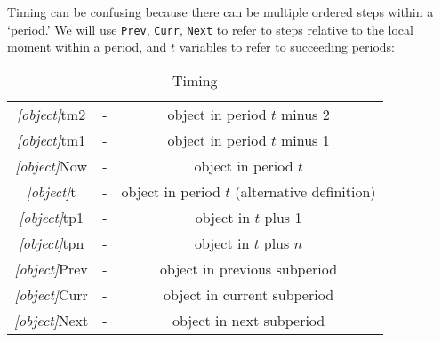 Timing can be confusing because there can be multiple ordered steps
within a `period.'  We will use \texttt{Prev}, \texttt{Curr}, \texttt{Next} to refer
to steps relative to the local moment within a period, and $t$ variables to refer to succeeding periods:
\begin{table}[h]
	\centering
	\begin{tabular}{||>{\ttfamily}ccc||}
		\hline
   \textit{[object]}tm2 & - & object in period $t$ minus 2
\\ \textit{[object]}tm1 & - & object in period $t$ minus 1
\\ \textit{[object]}Now & - & object in period $t$
\\ \textit{[object]}t   & - & object in period $t$ (alternative definition)
\\ \textit{[object]}tp1 & - & object in $t$ plus 1
\\ \textit{[object]}tpn & - & object in $t$ plus $n$
\\ \textit{[object]}Prev & - & object in previous subperiod
\\ \textit{[object]}Curr & - & object in current subperiod
\\ \textit{[object]}Next & - & object in next subperiod
\\	\hline
	\end{tabular}
	\caption{Timing}
	\label{table:Timing}
\end{table}


